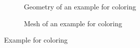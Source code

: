 \begin{figure}[!ht]
    \begin{subfigure}[b]{0.5\linewidth}
        \centering
        \caption{Geometry of an example for coloring}
    \end{subfigure}
    \begin{subfigure}[b]{0.5\linewidth}
        \centering
        \caption{Mesh of an example for coloring}
    \end{subfigure}
    \caption{Example for coloring}
    \label{qdt_fig:qdt_color_example}
\end{figure}
